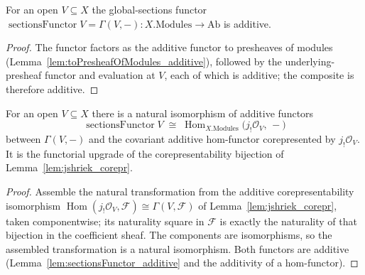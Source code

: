 \begin{lemma}

  \label{lem:sectionsFunctor_additive}
  For an open \(V \subseteq X\) the global-sections functor
  \(\operatorname{sectionsFunctor} V = \Gamma(V, -) : X.\mathrm{Modules} \to \mathrm{Ab}\) is
  additive.
\end{lemma}
\begin{proof}
  \leanok
  The functor factors as the additive functor to presheaves of modules
  (Lemma~\ref{lem:toPresheafOfModules_additive}), followed by the underlying-presheaf functor and
  evaluation at \(V\), each of which is additive; the composite is therefore additive.
\end{proof}

\begin{lemma}

  \label{lem:sectionsFunctorCorepIso}
  For an open \(V \subseteq X\) there is a natural isomorphism of additive functors
  \[
    \operatorname{sectionsFunctor} V
      \;\cong\;
    \operatorname{Hom}_{X.\mathrm{Modules}}\bigl(j_!\mathcal{O}_V,\, -\bigr)
  \]
  between \(\Gamma(V, -)\) and the covariant additive hom-functor corepresented by
  \(j_!\mathcal{O}_V\). It is the functorial upgrade of the corepresentability bijection of
  Lemma~\ref{lem:jshriek_corepr}.
\end{lemma}
\begin{proof}
  \leanok
  Assemble the natural transformation from the additive corepresentability isomorphism
  \(\operatorname{Hom}(j_!\mathcal{O}_V, \mathcal{F}) \cong \Gamma(V, \mathcal{F})\) of
  Lemma~\ref{lem:jshriek_corepr}, taken componentwise; its naturality square in \(\mathcal{F}\) is
  exactly the naturality of that bijection in the coefficient sheaf. The components are
  isomorphisms, so the assembled transformation is a natural isomorphism. Both functors are
  additive (Lemma~\ref{lem:sectionsFunctor_additive} and the additivity of a hom-functor).
\end{proof}

